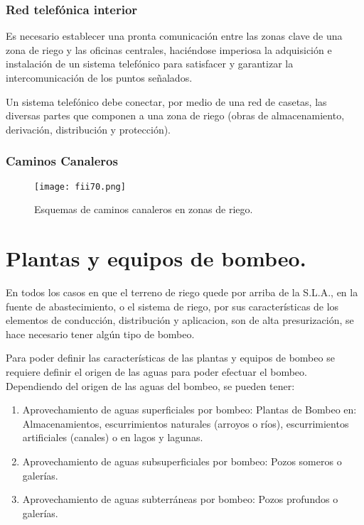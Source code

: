 \subsubsection{Red telefónica interior}

Es necesario establecer una pronta comunicación entre las zonas clave de una
zona de riego y las oficinas centrales, haciéndose imperiosa la adquisición e instalación
de un sistema telefónico para satisfacer y garantizar la intercomunicación de los puntos
señalados.


Un sistema telefónico debe conectar, por medio de una red de casetas, las
diversas partes que componen a una zona de riego (obras de almacenamiento,
derivación, distribución y protección).

\subsubsection{Caminos Canaleros}

\begin{figure}[h!]
	\centerline{\texttt{[image: fii70.png]}}
	\caption{Esquemas de caminos canaleros en zonas de riego.}
	\label{fii70}
\end{figure}

\section{Plantas y equipos de bombeo.}

En todos los casos en que el terreno de riego quede por arriba de la S.L.A., en la
fuente de abastecimiento, o el sistema de riego, por sus características de los
elementos de conducción, distribución y aplicacion, son de alta presurización, se hace
necesario tener algún tipo de bombeo.

Para poder definir las características de las plantas y equipos de bombeo se
requiere definir el origen de las aguas para poder efectuar el bombeo.
Dependiendo del origen de las aguas del bombeo, se pueden tener:
\begin{enumerate}
	\item Aprovechamiento de aguas superficiales por bombeo:
	      Plantas de Bombeo en: Almacenamientos, escurrimientos naturales (arroyos o ríos),
	      escurrimientos artificiales (canales) o en lagos y lagunas.
	\item Aprovechamiento de aguas subsuperficiales por bombeo:
	      Pozos someros o galerías.
	\item Aprovechamiento de aguas subterráneas por bombeo:
	      Pozos profundos o galerías.
\end{enumerate}

